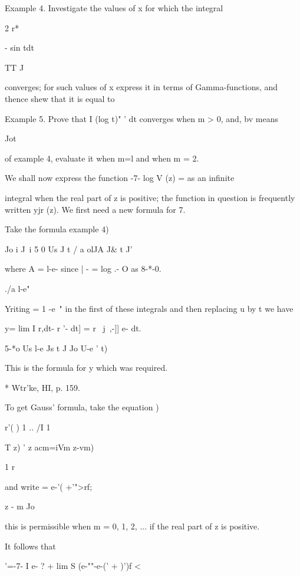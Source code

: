 Example 4. Investigate the values of x for which the integral

2 r*

 - sin tdt

TT J

converges; for such values of x express it in terms of
Gamma-functions, and thence shew that it is equal to


Example 5. Prove that I (log t)" ' dt converges when m > 0, and, bv
means

Jot

of example 4, evaluate it when m=l and when m = 2.


We shall now express the function -7- log V (z) = as an infinite

integral when the real part of z is positive; the function in
question is frequently written yjr (z). We first need a new formula
for 7.

Take the formula  example 4)

  Jo i J\ i 5 0 Us J t / a olJA J\& t J'

where A = l-e- since | - = log .- O as 8-*-0.

./a l-e"

 Yriting = 1 -e~" in the first of these integrals and then replacing u
by t we have

y= lim I r,dt- r '- dt] = r \ j~,-]] e- dt.

5-*o Us l-e Js t J Jo U-e ' t)

This is the formula for y which was required.

* Wtr'ke, HI, p. 159.

%
%

To get Gauss' formula, take the equation )

r'( ) 1 .. /I 1 \

T z) ' z acm=iVm z-vm)

1 r

and write = e-'( +'">rf;

z - m Jo

this is permissible when m = 0, 1, 2, ... if the real part of z is
positive.

It follows that

 '=-7- I e- ? + lim S (e-""-e-(' + )')f <

